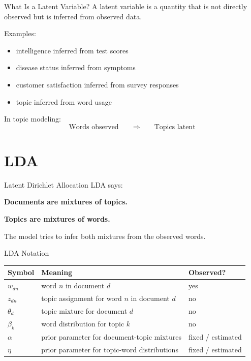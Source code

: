 \documentclass[aspectratio=169]{beamer}
\begin{document}
\begin{frame}{What Is a Latent Variable?}
A latent variable is a quantity that is not directly observed but is inferred from observed data.

\vspace{1em}
Examples:
\begin{itemize}
  \item intelligence inferred from test scores
  \item disease status inferred from symptoms
  \item customer satisfaction inferred from survey responses
  \item topic inferred from word usage
\end{itemize}

\vspace{1em}
\pause

In topic modeling:
\[
\text{Words observed}
\qquad \Longrightarrow \qquad
\text{Topics latent}
\]
\end{frame}

\section{LDA}

\begin{frame}{Latent Dirichlet Allocation}
\Large
LDA says:

\vspace{0.4cm}
\begin{center}
\textbf{Documents are mixtures of topics.}\par
\textbf{Topics are mixtures of words.}
\end{center}

\vspace{0.5cm}
\normalsize
The model tries to infer both mixtures from the observed words.
\end{frame}

\begin{frame}{LDA Notation}
\begin{center}
\begin{tabular}{lll}
\toprule
Symbol & Meaning & Observed? \\
\midrule
$w_{dn}$ & word $n$ in document $d$ & yes \\
$z_{dn}$ & topic assignment for word $n$ in document $d$ & no \\
$\theta_d$ & topic mixture for document $d$ & no \\
$\beta_k$ & word distribution for topic $k$ & no \\
$\alpha$ & prior parameter for document-topic mixtures & fixed / estimated \\
$\eta$ & prior parameter for topic-word distributions & fixed / estimated \\
\bottomrule
\end{tabular}
\end{center}
\end{frame}
\end{document}
